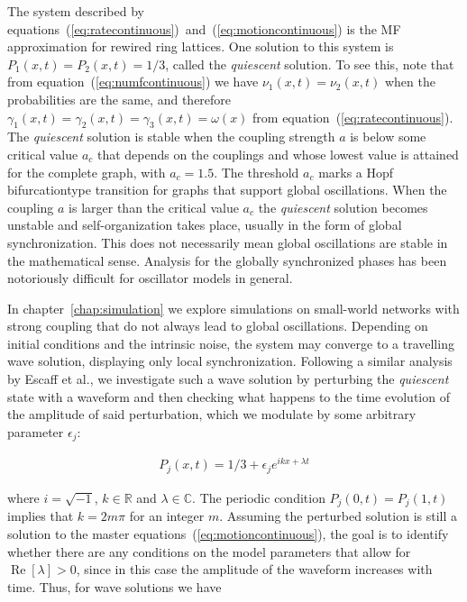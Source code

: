 The system described by equations~(\ref{eq:ratecontinuous})~and~(\ref{eq:motioncontinuous}) is the MF approximation for rewired ring
lattices. One solution to this system is $P_1(x,t)=P_2(x,t)=1/3$, called the \textit{quiescent} solution. To see this, note that from
equation~(\ref{eq:numfcontinuous}) we have $\nu_1(x,t) = \nu_2(x,t)$ when the probabilities are the same, and therefore $\gamma_1(x,t)
= \gamma_2(x,t) = \gamma_3(x,t)=\omega(x)$ from equation~(\ref{eq:ratecontinuous}). The \textit{quiescent} solution is stable when the
coupling strength $a$ is below some critical value $a_c$ that depends on the couplings and whose lowest value is attained for the
complete graph, with $a_c=1.5$. The threshold $a_c$ marks a Hopf bifurcation\footnotemark type transition for graphs that support
global oscillations\cite{Wood06a}\cite{rodrigues2020synchronization}\cite{Wood06b}\cite{Wood07b}. When the coupling $a$ is larger than
the critical value $a_c$ the \textit{quiescent} solution becomes unstable and self-organization takes place, usually in the form of
global synchronization. This does not necessarily mean global oscillations are stable in the mathematical sense. Analysis for the
globally synchronized phases has been notoriously difficult for oscillator models in general.


In chapter~\ref{chap:simulation} we explore simulations on small-world networks with strong coupling that do not always lead to global
oscillations. Depending on initial conditions and the intrinsic noise, the system may converge to a travelling wave solution,
displaying only local synchronization. Following a similar analysis by Escaff et al.\cite{escaff2014arrays}, we investigate such a wave
solution by perturbing the \textit{quiescent} state with a waveform and then checking what happens to the time evolution of the
amplitude of said perturbation, which we modulate by some arbitrary parameter $\epsilon_j$:

\begin{align}
  P_j(x,t) = 1/3 + \epsilon_j e^{ikx + \lambda t}
  \label{eq:solperturb}
\end{align}

\noindent where $i=\sqrt{-1}$, $k\in\mathbb{R}$ and $\lambda\in\mathbb{C}$. The periodic condition $P_j(0,t) = P_j(1,t)$ implies that
$k=2m\pi$ for an integer $m$. Assuming the perturbed solution is still a solution to the master equations~(\ref{eq:motioncontinuous}),
the goal is to identify whether there are any conditions on the model parameters that allow for $\operatorname{Re}[\lambda]>0$, since
in this case the amplitude of the waveform increases with time. Thus, for wave solutions we have

